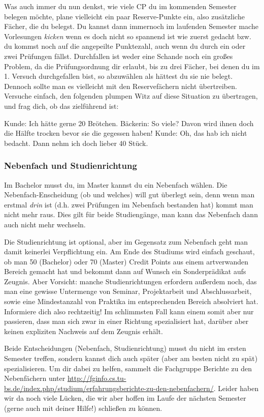 \begin{multicols}{2}
	Was auch immer du nun denkst, wie viele CP du im kommenden Semester belegen möchte, plane vielleicht ein paar Reserve-Punkte ein, also zusätzliche Fächer, die du belegst. Du kannst dann immernoch im laufenden Semester mache Vorlesungen \emph{kicken} wenn es doch nicht so spannend ist wie zuerst gedacht bzw. du kommst noch auf die angepeilte Punktezahl, auch wenn du durch ein oder zwei Prüfungen fällst. Durchfallen ist weder eine Schande noch ein großes Problem, da die Prüfungsordnung dir erlaubt, bis zu drei Fächer, bei denen du im 1. Versuch durchgefallen bist, so abzuwählen als hättest du sie nie belegt. Dennoch sollte man es vielleicht mit den Reservefächern nicht übertreiben. Versuche einfach, den folgenden plumpen Witz auf diese Situation zu übertragen, und frag dich, ob das zielführend ist:

	Kunde: Ich hätte gerne 20 Brötchen. 
	Bäckerin: So viele? Davon wird ihnen doch die Hälfte trocken bevor sie die gegessen haben!
	Kunde: Oh, das hab ich nicht bedacht. Dann nehm ich doch lieber 40 Stück.

\subsubsection{Nebenfach und Studienrichtung}
\label{nebenfach}
	Im Bachelor musst du, im Master kannst du ein Nebenfach wählen. Die Nebenfach-Enscheidung (ob und welches) will gut überlegt sein, denn wenn man erstmal \emph{drin} ist (d.h. zwei Prüfungen im Nebenfach bestanden hat) kommt man nicht mehr raus. Dies gilt für beide Studiengänge, man kann das Nebenfach dann auch nicht mehr wechseln. 
 
	Die Studienrichtung ist  optional, aber im Gegensatz zum Nebenfach geht man damit keinerlei Verpflichtung ein. Am Ende des Studiums wird einfach geschaut, ob man 50 (Bachelor) oder 70 (Master) Credit Points aus einem artverwanden Bereich gemacht hat und bekommt dann auf Wunsch ein Sonderprädikat aufs Zeugnis. Aber Vorsicht: manche Studienrichtungen erfordern außerdem noch, das man eine gewisse Untermenge von Seminar, Projektarbeit und Abschlussarbeit, sowie eine Mindestanzahl von Praktika im entsprechenden Bereich absolviert hat. Informiere dich also rechtzeitig! Im schlimmsten Fall kann einem somit aber nur passieren, dass man sich zwar in einer Richtung spezialisiert hat, darüber aber keinen expliziten Nachweis auf dem Zeugnis erhält.

	Beide Entscheidungen (Nebenfach, Studienrichtung) musst du nicht im ersten Semester treffen, sondern kannst dich auch später (aber am besten nicht zu spät) spezialisieren. Um dir dabei zu helfen, sammelt die Fachgruppe Berichte zu den Nebenfächern unter \url{http://fginfo.cs.tu-bs.de/index.php/studium/erfahrungsberichte-zu-den-nebenfachern/}. Leider haben wir da noch viele Lücken, die wir aber hoffen im Laufe der nächsten Semester (gerne auch mit deiner Hilfe!) schließen zu können.


\end{multicols}

